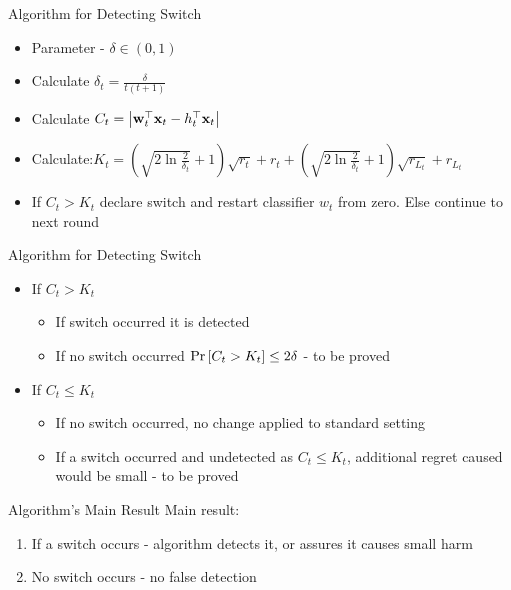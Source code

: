 \documentclass{beamer}
\begin{document}
\begin{frame}{Algorithm for Detecting Switch}
\begin{itemize}
\item Parameter - $\delta\in\left(0,1\right)$\newline
\item Calculate $\delta_t=\frac{\delta}{t(t+1)}$\newline
\item Calculate $C_t=\left\vert{\mathbf{w}}^{\top}_{t}\mathbf{x}_{t}-h_{t}^{\top}\mathbf{x}_{t}\right\vert$\newline
\item Calculate:\newline\newline $K_t=\left(\sqrt{2\ln{\frac{2}{\delta_t}}}+1\right)\sqrt{r_t}+r_t+\left(\sqrt{2\ln{\frac{2}{\delta_t}}}+1\right)\sqrt{r_{L_t}}+r_{L_t}$\newline
\item If $C_t>K_t$ declare switch and restart classifier $w_t$ from zero. Else continue to next round
\end{itemize}
\end{frame}

\begin{frame}{Algorithm for Detecting Switch}
\begin{itemize}
\item If $C_t>K_t$ \newline
\begin{itemize}
\item If switch occurred it is detected  \newline
\item If no switch occurred ${\rm Pr}\left[{C_t>K_t}\right]\leq 2\delta$ - to be proved  \newline
\end{itemize}
\item If $C_t\leq K_t$ \newline
\begin{itemize}
\item If no switch occurred, no change applied to standard setting   \newline
\item If a switch occurred and undetected as $C_t\leq K_t$, additional regret caused would be small - to be proved   \newline 
\end{itemize}
\end{itemize}
\end{frame}

\begin{frame}{Algorithm's Main Result}
Main result:\newline\newline
\begin{enumerate}
\item If a switch occurs - algorithm detects it, or assures it causes small harm\newline 
\item No switch occurs - no false detection
\end{enumerate}
\end{frame}
\end{document}
